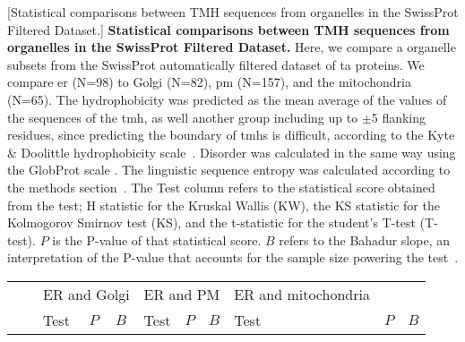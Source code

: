 	\begin{table}[htbp]
	\centering
	[Statistical comparisons between TMH sequences from organelles in the SwissProt Filtered Dataset.]
	{\textbf{Statistical comparisons between TMH sequences from organelles in the SwissProt Filtered Dataset.}
	Here, we compare a organelle subsets from the SwissProt automatically filtered dataset of \gls{ta} proteins.
	We compare \gls{er} (N=98) to Golgi (N=82), \gls{pm} (N=157), and the mitochondria (N=65).
	The hydrophobicity was predicted as the mean average of the values of the sequences of the \gls{tmh}, as well another group including up to $\pm$5 flanking residues, since predicting the boundary of \gls{tmh}s is difficult, according to the Kyte \& Doolittle hydrophobicity scale~\cite{Kyte1982}.
	Disorder was calculated in the same way using the GlobProt scale \cite{Linding2003}.
	The linguistic sequence entropy was calculated according to the methods section~\cite{Shannon1948}.
	The Test column refers to the statistical score obtained from the test; H statistic for the Kruskal Wallis (KW), the KS statistic for the Kolmogorov Smirnov test (KS), and the t-statistic for the student's T-test (T-test).
	$P$ is the P-value of that statistical score.
	$B$ refers to the Bahadur slope, an interpretation of the P-value that accounts for the sample size powering the test~\cite{Bahadur1967, Bahadur1971}.}
		\tiny

		\begin{tabular}{clrrrrrrrrr}
								&       & \multicolumn{3}{c}{ER and Golgi} & \multicolumn{3}{c}{ER and PM} & \multicolumn{1}{l}{ER and mitochondria} &       &  \\
								&       & \multicolumn{1}{l}{Test} & \multicolumn{1}{l}{$P$} & \multicolumn{1}{l}{$B$} & \multicolumn{1}{l}{Test} & \multicolumn{1}{l}{$P$} & \multicolumn{1}{l}{$B$} & \multicolumn{1}{l}{Test} & \multicolumn{1}{l}{$P$} & \multicolumn{1}{l}{$B$} \\


\end{tabular}
\end{table}

